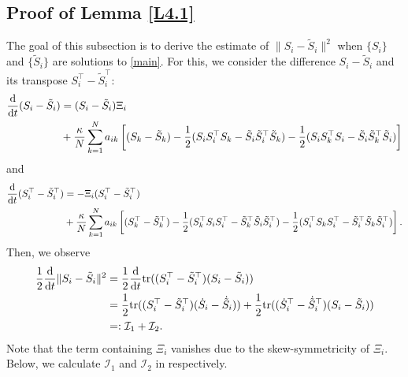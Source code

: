 \documentclass[11pt,reqno]{amsart}
\numberwithin{figure}{section}
\newcommand{\kp}{\kappa}
\newcommand{\dd}{  {\textup{d}} }
\newcommand{\dt} {    {  \textup{d}t   }    }
\newcommand{\tr}{{\textup{tr}}}
\begin{document}
\subsection{Proof of Lemma \ref{L4.1}}
The goal of this subsection is to derive the estimate of $\|S_i - \tilde S_i\|^2$ when $\{S_i\}$ and $\{\tilde S_i\}$ are solutions to \eqref{main}. For this,  we consider the difference $S_i-\tilde S_i$ and its transpose $S_i^\top - \tilde S_i^\top$:
\begin{align*}
\frac\dd\dt (S_i- \tilde S_i) &= (S_i - \tilde S_i)\Xi_i \\
& + \frac\kp N \sum_{k=1}^N a_{ik} \left[ (S_k - \tilde S_k) - \frac12 ( S_i S_i^\top S_k - \tilde S_i \tilde S_i^\top \tilde S_k ) - \frac12 ( S_iS_k^\top S_i - \tilde S_i \tilde S_k^\top \tilde S_i) \right]
\end{align*} 
and
\begin{align*}
\frac\dd\dt (S_i^\top - \tilde S_i^\top ) &= - \Xi_i(S_i^\top -\tilde S_i^\top) \\
&+  \frac\kp N \sum_{k=1}^N a_{ik} \left[  (S_k^\top  - \tilde S_k^\top ) - \frac12 ( S_k^\top S_i S_i^\top  -  \tilde S_k^\top \tilde S_i \tilde S_i^\top   ) - \frac12 ( S_i^\top S_k S_i^\top - \tilde S_i^\top \tilde S_k  \tilde S_i^\top ) \right].
\end{align*} 
Then, we observe 
\begin{align} \label{C-15}
\begin{aligned}
\frac12\frac\dd\dt \|S_i - \tilde S_i\|^2  &=  \frac{1}{2}\frac\dd\dt \tr ( (S_i^\top  - \tilde S_i^\top) ( S_i - \tilde S_i) )  \\
& = \frac{1}{2}\tr( ( S_i^\top - \tilde S_i^\top)(\dot S_i - \dot{\tilde S}_i))  +  \frac{1}{2} \tr (( \dot S_i^\top - \dot{ \tilde S}_i^\top) (S_i - \tilde S_i)) \\
& =: \mathcal I_1 + \mathcal I_2.
\end{aligned}
\end{align}
Note that the term containing $\Xi_i$ vanishes due to the skew-symmetricity of $\Xi_i$. 
Below, we calculate $\mathcal I_1$ and $\mathcal I_2$ in  respectively. \newline
\end{document}
